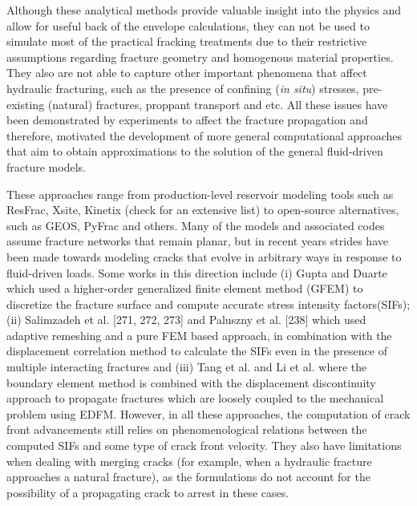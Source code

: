     Although these analytical methods provide valuable insight into the physics and allow for useful back of the envelope calculations, they can not be used to simulate most of the practical fracking treatments due to their restrictive assumptions regarding fracture geometry and homogenous material properties. They also are not able to capture other important phenomena that affect hydraulic fracturing, such as the presence of confining (\textit{in situ}) stresses, pre-existing (natural) fractures, proppant transport and etc.
    All these issues have been demonstrated by experiments to affect the fracture propagation and therefore, motivated the development of more general computational approaches that aim to obtain approximations to the solution of the general fluid-driven fracture models.

    These approaches range from production-level reservoir modeling tools such as ResFrac\cite{mcclure2017three, mcclure2018resfrac}, Xsite\cite{itasca}, Kinetix\cite{kinetix,kinetixforpetrel} (check \cite{chen2021review} for an extensive list) to open-source alternatives, such as GEOS\cite{settgast2012simulation, settgast2014simulation, settgast2017fully}, PyFrac\cite{zia2020pyfrac} and others. Many of the models and associated codes assume fracture networks that remain planar, but in recent years strides have been made towards modeling cracks that evolve in arbitrary ways in response to fluid-driven loads. Some works in this direction include (i) Gupta and Duarte \cite{gupta2014simulation, gupta2018coupled} which used a higher-order generalized finite element method (GFEM) to discretize the fracture surface and compute accurate stress intensity factors(SIFs); (ii) Salimzadeh et al. [271, 272, 273] and Paluszny et al. [238] which used adaptive remeshing and a pure FEM based approach, in combination with the displacement correlation method to calculate the SIFs even in the presence of multiple interacting fractures and (iii) Tang et al. \cite{tang2019analysis} and Li et al. \cite{li2020hydromechanical,li2021development} where the boundary element method is combined with the displacement discontinuity approach to propagate fractures which are loosely coupled to the mechanical problem using EDFM\cite{hajibeygi2011hierarchical}. However, in all these approaches, the computation of crack front advancements still relies on phenomenological relations between the computed SIFs and some type of crack front velocity. They also have limitations when dealing with merging cracks (for example, when a hydraulic fracture approaches a natural fracture), as the formulations do not account for the possibility of a propagating crack to arrest in these cases.
    
